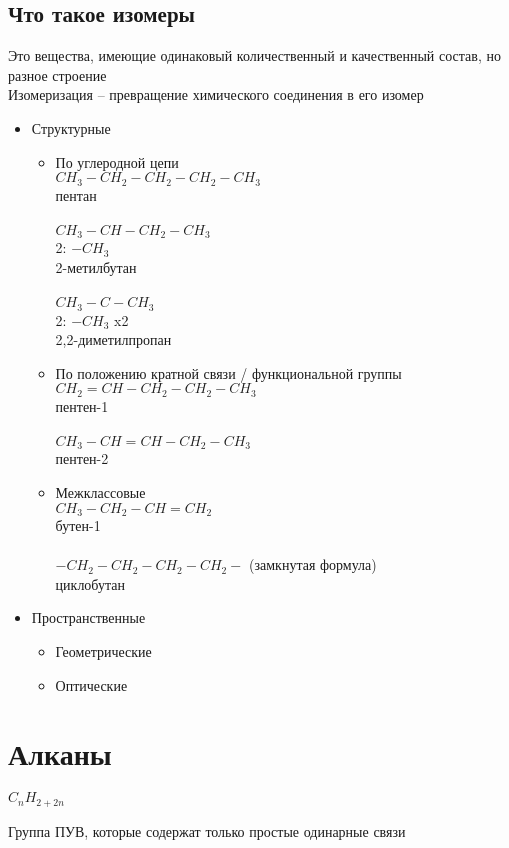 \documentclass[a4paper]{article}
\begin{document}
\subsection{Что такое изомеры}
Это вещества, имеющие одинаковый количественный и качественный состав, но
разное строение\\
Изомеризация -- превращение химического соединения в его изомер
\begin{itemize}
\item Структурные
	\begin{itemize}
		\item По углеродной цепи\\
			$CH_{3}-CH_{2}-CH_{2}-CH_{2}-CH_{3}$\\пентан\\\\
			$CH_{3}-CH-CH_{2}-CH_{3}$\\
			2: $-CH_{3}$\\ 2-метилбутан\\\\
			$CH_{3}-{C}-CH_{3}$\\
			2: $-CH_{3}$ x2\\ 2,2-диметилпропан
		\item По положению кратной связи / функциональной группы\\
			$CH_{2}=CH-CH_{2}-CH_{2}-CH_{3}$\\ пентен-1\\\\
			$CH_{3}-CH=CH-CH_{2}-CH_{3}$\\ пентен-2
		\item Межклассовые\\
			$CH_{3}-CH_{2}-CH=CH_{2}$\\ бутен-1\\\\
			$-CH_2-CH_2-CH_2-CH_2-$ (замкнутая формула)\\
			циклобутан
	\end{itemize}
\item Пространственные
	\begin{itemize}
		\item Геометрические
		\item Оптические
	\end{itemize}
\end{itemize}
\pagebreak

\section{Алканы} \begin{flushright} $C_{n}H_{2+2n}$ \end{flushright}
Группа ПУВ, которые содержат только простые одинарные связи
\end{document}
